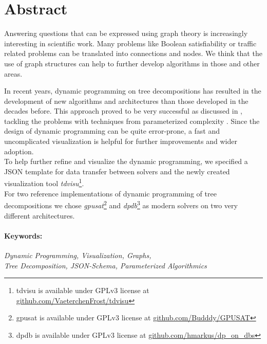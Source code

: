 \documentclass[a4paper, 12pt, bibliography=totoc]{scrartcl}
\begin{document}
\leftskip=0pt\rightskip=0pt

\newpage
\section*{Abstract}

\vspace{4ex}

Answering questions that can be expressed using graph theory is increasingly interesting in scientific work.
Many problems like Boolean satisfiability or traffic related problems can be translated into connections and nodes.
We think that the use of graph structures can help to further develop algorithms in those and other areas.

In recent years, dynamic programming on tree decompositions has resulted in the development of new algorithms and architectures than those developed in the decades before. This approach proved to be very successful as discussed in \cite{fichtegpusat2}, tackling the problems with techniques from parameterized complexity \cite[page 2]{dpdbpadl2020}.
Since the design of dynamic programming can be quite error-prone, a fast and uncomplicated visualization is helpful for further improvements and wider adoption.\\

To help further refine and visualize the dynamic programming,
we specified a JSON template for data transfer between solvers and the newly created visualization tool \textit{tdvisu}\footnote{tdvisu is available under GPLv3 license at \url{github.com/VaeterchenFrost/tdvisu}}.\\

For two reference implementations of dynamic programming of tree decompositions we chose \textit{gpusat}\footnote{gpusat is available under GPLv3 license at \url{github.com/Budddy/GPUSAT}} and \textit{dpdb}\footnote{dpdb is available under GPLv3 license at \url{github.com/hmarkus/dp\_on\_dbs}} as modern solvers on two very different architectures.\\


\paragraph{Keywords:}
\textit{Dynamic Programming, Visualization, Graphs, \\
Tree Decomposition, JSON-Schema, Parameterized Algorithmics 
}\leftskip=1.6cm \rightskip=1cm

\leftskip=0pt\rightskip=0pt
\end{document}
